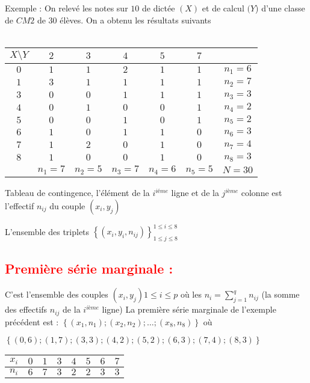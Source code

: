 \documentclass[12pt]{article}
\begin{document}
Exemple : On relevé les notes sur $10$ de dictée $(X)$ et de calcul $(Y$) d’une classe de $CM2$ de $30$ élèves. On a obtenu les résultats suivants\\
\\
\begin{tabular}{|c|c|c|c|c|c|c|}
\hline
$X\setminus Y$  & $2$ & $3$ & $4$ & $5$ & $7$ &  \\
\hline
$0$ & $1$ & $1$ & $2$ & $1$ & $1$ & $n_{1}=6$ \\
\hline
$1$  & $3$ & $1$ & $1$ & $1$ & $1$ & $n_{2}=7$ \\
\hline
$3$ & $0$ & $0$ & $1$ & $1$ & $1$ & $n_{3}=3$ \\
\hline
$4$  & $0$ & $1$ & $0$ & $0$ & $1$ & $n_{4}=2$ \\
\hline
$5$ & $0$ & $0$ & $1$ & $0$ & $1$ & $n_{5}=2$ \\
\hline
$6$  & $1$ & $0$ & $1$ & $1$ & $0$ & $n_{6}=3$ \\
\hline
$7$ & $1$ & $2$ & $0$ & $1$ & $0$ & $n_{7}=4$ \\
\hline
$8$  & $1$ & $0$ & $0$ & $1$ & $0$ & $n_{8}=3$ \\
\hline
  & $n_{1}=7$ & $n_{2}=5$ & $n_{3}=7$ & $n_{4}=6$ & $n_{5}=5$ & $N=30$ \\
\hline
\end{tabular}

Tableau de contingence, l’élément de la $i^{iéme}$ ligne et de la $j^{ième}$ colonne est l’effectif $n_{ij}$ du couple $(x_{i},y_{j})$

L’ensemble des triplets 
$\left\lbrace (x_{i},y_{i},n_{ij}) \right\rbrace^{1\leq i \leq 8}_{1\leq j \leq8} $

\subsection*{\textbf{\textcolor{red}{Première série marginale :}}}
C’est l’ensemble des couples $(x_{i},y_{j}) 1\leq i\leq p$  où les $n_{i}=\sum_{j=1}^{q}n_{ij}$ (la somme des effectifs $n_{ij}$ de la $i^{ième}$ ligne)  La première série marginale de l’exemple précédent est : 
$\left\lbrace (x_{1}, n_{1}) ; (x_{2}, n_{2}) ; …  ; (x_{8}, n_{8})\right\rbrace $   où  

$\left\lbrace (0,6) ; (1,7) ; (3,3) ; (4,2) ; (5,2) ; (6,3) ; (7,4) ; (8,3)\right\rbrace $

\begin{table}[h]
\begin{tabular}{|c|c|c|c|c|c|c|c|}
\hline
$x_{i}$  & $0$ & $1$ & $3$ & $4$ & $5$ & $6$ & $7$ \\
\hline
$n_{i}$  & $6$ & $7$  & $3$ & $2$ & $2$ & $3$ & $3$  \\
\hline
\end{tabular}
\end{table}
\end{document}

